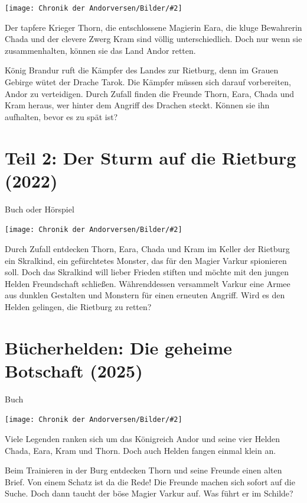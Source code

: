 \documentclass[10pt, a4paper, oneside]{book}
\newcommand{\fillbreak}{\vspace*{\fill}\columnbreak}
\newcommand{\produkt}[1]{%
    \section{#1}%
    \label{Produkt: #1}%
}
\newcommand{\bildmitts}[2][height=0.32\textwidth,width=0.48\textwidth,keepaspectratio]{%
    \begin{center}
        \texttt{[image: Chronik der Andorversen/Bilder/\#2]}
    \end{center}
}
\begin{document}
\begin{multicols}{2}
\bildmitts{Der Fluch des roten Drachen (2021).png}

Der tapfere Krieger Thorn, die entschlossene Magierin Eara, die kluge Bewahrerin Chada und der clevere Zwerg Kram sind völlig unterschiedlich. Doch nur wenn sie zusammenhalten, können sie das Land Andor retten.

König Brandur ruft die Kämpfer des Landes zur Rietburg, denn im Grauen Gebirge wütet der Drache Tarok. Die Kämpfer müssen sich darauf vorbereiten, Andor zu verteidigen. Durch Zufall finden die Freunde Thorn, Eara, Chada und Kram heraus, wer hinter dem Angriff des Drachen steckt. Können sie ihn aufhalten, bevor es zu spät ist?





\produkt{Teil 2: Der Sturm auf die Rietburg (2022)}

\begin{center}
    Buch oder Hörspiel
\end{center}

\bildmitts{Der Sturm auf die Rietburg (2022).png}

Durch Zufall entdecken Thorn, Eara, Chada und Kram im Keller der Rietburg ein Skralkind, ein gefürchtetes Monster, das für den Magier Varkur spionieren soll. Doch das Skralkind will lieber Frieden stiften und möchte mit den jungen Helden Freundschaft schließen. Währenddessen versammelt Varkur eine Armee aus dunklen Gestalten und Monstern für einen erneuten Angriff. Wird es den Helden gelingen, die Rietburg zu retten?







\fillbreak
\produkt{Bücherhelden: Die geheime Botschaft (2025)}

\begin{center}
    Buch
\end{center}

\bildmitts{Die geheime Botschaft (2025).jpeg}

Viele Legenden ranken sich um das Königreich Andor und seine vier Helden Chada, Eara, Kram und Thorn. Doch auch Helden fangen einmal klein an.

Beim Trainieren in der Burg entdecken Thorn und seine Freunde einen alten Brief. Von einem Schatz ist da die Rede! Die Freunde machen sich sofort auf die Suche. Doch dann taucht der böse Magier Varkur auf. Was führt er im Schilde?







\end{multicols}
\end{document}
